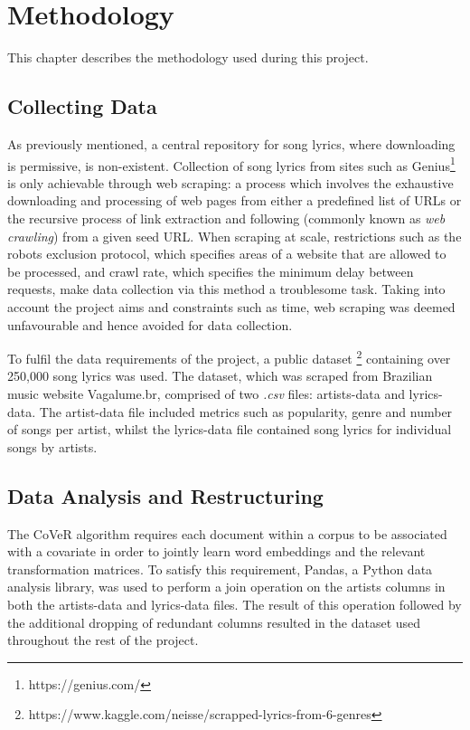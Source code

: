 \chapter{Methodology}
This chapter describes the methodology used during this project. 
\label{chap:data_methodology}
\section{Collecting Data}
As previously mentioned, a central repository for song lyrics, where downloading is permissive, is non-existent. Collection of song lyrics from sites such as Genius\footnote{https://genius.com/} is only achievable through web scraping: a process which involves the exhaustive downloading and processing of web pages from either a predefined list of URLs or the recursive process of link extraction and following (commonly known as \textit{web crawling}) from a given seed URL. When scraping at scale, restrictions such as the robots exclusion protocol, which specifies areas of a website that are allowed to be processed, and crawl rate, which specifies the minimum delay between requests, make data collection via this method a troublesome task. Taking into account the project aims and constraints such as time, web scraping was deemed unfavourable and hence avoided for data collection.

\noindent
\newline
To fulfil the data requirements of the project, a public dataset \footnote{https://www.kaggle.com/neisse/scrapped-lyrics-from-6-genres} containing over 250,000 song lyrics was used. The dataset, which was scraped from Brazilian music website Vagalume.br, comprised of two \textit{.csv} files: artists-data and lyrics-data. The artist-data file included metrics such as popularity, genre and number of songs per artist, whilst the lyrics-data file contained song lyrics for individual songs by artists.

\section{Data Analysis and Restructuring}
The CoVeR algorithm requires each document within a corpus to be associated with a covariate in order to jointly learn word embeddings and the relevant transformation matrices. To satisfy this requirement, Pandas, a Python data analysis library, was used to perform a join operation on the artists columns in both the artists-data and lyrics-data files. The result of this operation followed by the additional dropping of redundant columns resulted in the dataset used throughout the rest of the project.

